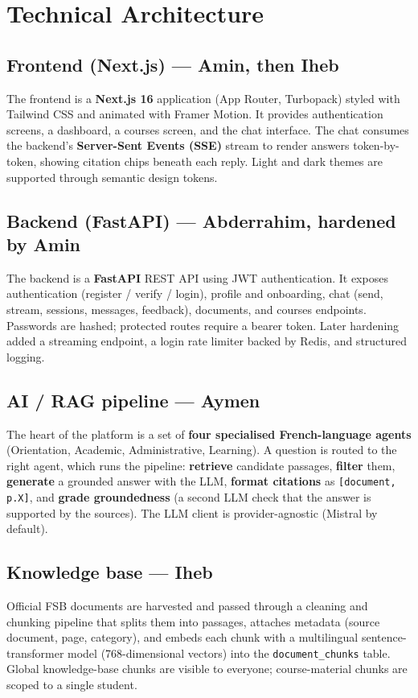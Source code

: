 \documentclass[11pt,a4paper]{article}
\begin{document}
\section{Technical Architecture}
\subsection{Frontend (Next.js) --- Amin, then Iheb}
The frontend is a \textbf{Next.js 16} application (App Router, Turbopack) styled with Tailwind CSS and animated with Framer Motion. It provides authentication screens, a dashboard, a courses screen, and the chat interface. The chat consumes the backend's \textbf{Server-Sent Events (SSE)} stream to render answers token-by-token, showing citation chips beneath each reply. Light and dark themes are supported through semantic design tokens.

\subsection{Backend (FastAPI) --- Abderrahim, hardened by Amin}
The backend is a \textbf{FastAPI} REST API using JWT authentication. It exposes authentication (register / verify / login), profile and onboarding, chat (send, stream, sessions, messages, feedback), documents, and courses endpoints. Passwords are hashed; protected routes require a bearer token. Later hardening added a streaming endpoint, a login rate limiter backed by Redis, and structured logging.

\subsection{AI / RAG pipeline --- Aymen}
The heart of the platform is a set of \textbf{four specialised French-language agents} (Orientation, Academic, Administrative, Learning). A question is routed to the right agent, which runs the pipeline: \textbf{retrieve} candidate passages, \textbf{filter} them, \textbf{generate} a grounded answer with the LLM, \textbf{format citations} as \texttt{[document, p.X]}, and \textbf{grade groundedness} (a second LLM check that the answer is supported by the sources). The LLM client is provider-agnostic (Mistral by default).

\subsection{Knowledge base --- Iheb}
Official FSB documents are harvested and passed through a cleaning and chunking pipeline that splits them into passages, attaches metadata (source document, page, category), and embeds each chunk with a multilingual sentence-transformer model (768-dimensional vectors) into the \texttt{document\_chunks} table. Global knowledge-base chunks are visible to everyone; course-material chunks are scoped to a single student.
\end{document}
